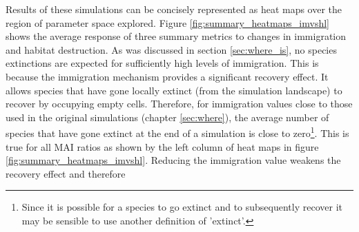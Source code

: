 Results of these simulations can be concisely represented as heat maps over the region of parameter space explored. Figure \ref{fig:summary_heatmaps_imvshl} shows the average response of three summary metrics to changes in immigration and habitat destruction. As was discussed in section \ref{sec:where_is}, no species extinctions are expected for sufficiently high levels of immigration. This is because the immigration mechanism provides a significant recovery effect. It allows species that have gone locally extinct (from the simulation landscape) to recover by occupying empty cells. Therefore, for immigration values close to those used in the original simulations (chapter \ref{sec:where}), the average number of species that have gone extinct at the end of a simulation is close to zero\footnote{Since it is possible for a species to go extinct and to subsequently recover it may be sensible to use another definition of 'extinct'.}. This is true for all MAI ratios as shown by the left column of heat maps in figure \ref{fig:summary_heatmaps_imvshl}. Reducing the immigration value weakens the recovery effect and therefore

